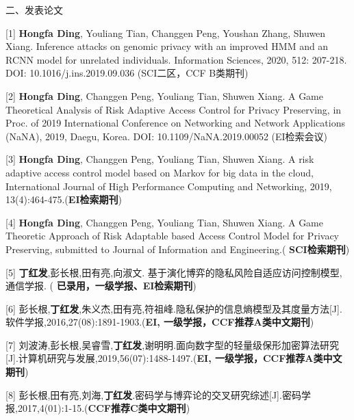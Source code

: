 \documentclass[pdftex,notypeinfo,twoside,openany,UTF8,fntef]{CASthesis}
\theoremstyle{THrm}{
	\newtheorem{question}{Question}[section]
	\newtheorem{property}{性质}[section]
	\newtheorem{assumption}{假设}[section]
	\newtheorem{claim}[lemma]{断言}
	
}
\begin{document}
\begin{resumelist}{二、发表论文}
	
[1] \textbf{Hongfa Ding}, Youliang Tian, Changgen Peng, Youshan Zhang, Shuwen Xiang. Inference attacks on genomic privacy with an improved HMM and an RCNN model for unrelated individuals. Information Sciences, 2020, 512: 207-218. DOI: 10.1016/j.ins.2019.09.036 (SCI二区，CCF B类期刊)

[2] \textbf{Hongfa Ding}, Changgen Peng, Youliang Tian, Shuwen Xiang. A Game Theoretical Analysis of Risk Adaptive Access Control for Privacy Preserving, in Proc. of 2019 International Conference on Networking and Network Applications (NaNA), 2019, Daegu, Korea. DOI: 10.1109/NaNA.2019.00052 (EI检索会议)

[3] \textbf{Hongfa Ding}, Changgen Peng, Youliang Tian, Shuwen Xiang. A risk adaptive access control model based on Markov for big data in the cloud, International Journal of High Performance Computing and Networking, 2019, 13(4):464-475.(\textbf{EI检索期刊})

[4] \textbf{Hongfa Ding}, Changgen Peng, Youliang Tian, Shuwen Xiang. A Game Theoretic Approach of Risk Adaptable based Access Control Model for Privacy Preserving, submitted to  Journal of Information and Engineering.(\textbf{
	SCI检索期刊})

[5] \textbf{丁红发},彭长根,田有亮,向淑文. 基于演化博弈的隐私风险自适应访问控制模型, 通信学报. (\textbf{
	已录用，一级学报、EI检索期刊})

[6] 彭长根,\textbf{丁红发},朱义杰,田有亮,符祖峰.隐私保护的信息熵模型及其度量方法[J].软件学报,2016,27(08):1891-1903.(\textbf{EI, 一级学报，CCF推荐A类中文期刊})

[7] 刘波涛,彭长根,吴睿雪,\textbf{丁红发},谢明明.面向数字型的轻量级保形加密算法研究[J].计算机研究与发展,2019,56(07):1488-1497.(\textbf{EI, 一级学报，CCF推荐A类中文期刊})
 
[8]  彭长根,田有亮,刘海,\textbf{丁红发}.密码学与博弈论的交叉研究综述[J].密码学报,2017,4(01):1-15.(\textbf{CCF推荐C类中文期刊})

\end{resumelist}
\end{document}
